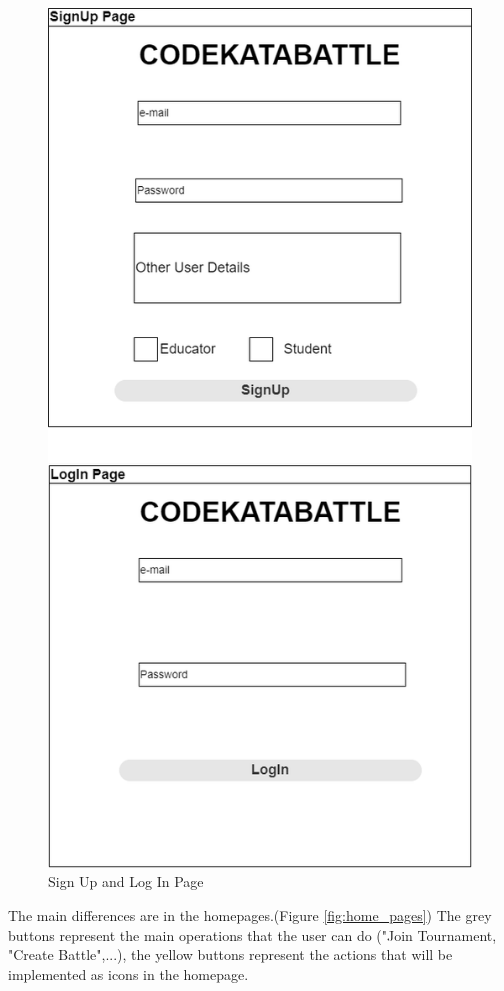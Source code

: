         \begin{figure}[H]
        \centering
        \includegraphics[scale=0.55]{images/interfaces_1 (1).png}
        \caption{Sign Up and Log In Page}
        \label{fig:interfaces_1}
    \end{figure}
    \clearpage
The main differences are in the homepages.(Figure \ref{fig:home_pages})
The grey buttons represent the main operations that the user can do ("Join Tournament, "Create Battle",...), the yellow buttons represent the actions that will be implemented as icons in the homepage.

